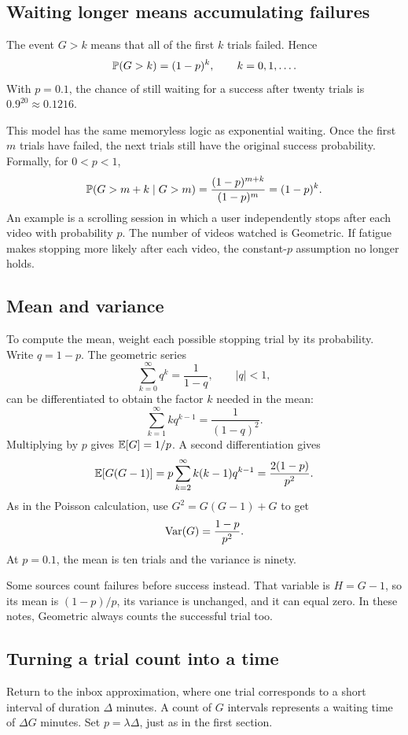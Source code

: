 \subsection{Waiting longer means accumulating failures}

The event \(G>k\) means that all of the first \(k\) trials failed. Hence
\[
  \mathbb{P}(G>k)=(1-p)^k,\qquad k=0,1,\ldots.
\]
With \(p=0.1\), the chance of still waiting for a success after twenty
trials is \(0.9^{20}\approx0.1216\).

This model has the same memoryless logic as exponential waiting.
Once the first \(m\) trials have failed, the next trials still have the
original success probability. Formally, for \(0<p<1\),
\[
  \mathbb{P}(G>m+k\mid G>m)
  =\frac{(1-p)^{m+k}}{(1-p)^m}
  =(1-p)^k.
\]
An example is a scrolling session in which a user independently stops
after each video with probability \(p\). The number of videos watched is
Geometric. If fatigue makes stopping more likely after each video,
the constant-\(p\) assumption no longer holds.

\subsection{Mean and variance}

To compute the mean, weight each possible stopping trial by its
probability. Write \(q=1-p\). The geometric series
\[
  \sum_{k=0}^{\infty}q^k=\frac1{1-q},\qquad |q|<1,
\]
can be differentiated to obtain the factor \(k\) needed in the mean:
\[
  \sum_{k=1}^{\infty}kq^{k-1}=\frac1{(1-q)^2}.
\]
Multiplying by \(p\) gives \(\mathbb{E}[G]=1/p\).
A second differentiation gives
\[
  \mathbb{E}[G(G-1)]
  =p\sum_{k=2}^{\infty}k(k-1)q^{k-1}
  =\frac{2(1-p)}{p^2}.
\]
As in the Poisson calculation, use \(G^2=G(G-1)+G\) to get
\[
  \operatorname{Var}(G)=\frac{1-p}{p^2}.
\]
At \(p=0.1\), the mean is ten trials and the variance is ninety.

Some sources count failures before success instead. That variable is
\(H=G-1\), so its mean is \((1-p)/p\), its variance is unchanged,
and it can equal zero. In these notes, Geometric always counts the
successful trial too.

\subsection{Turning a trial count into a time}

Return to the inbox approximation, where one trial corresponds to a
short interval of duration \(\Delta\) minutes.
A count of \(G\) intervals represents a waiting time of \(\Delta G\)
minutes. Set \(p=\lambda\Delta\), just as in the first section.

